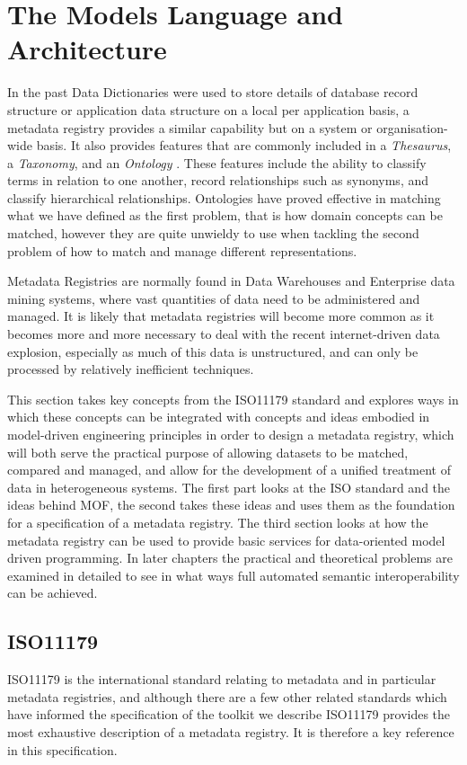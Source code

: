 \section{The Models Language and Architecture}

In the past Data Dictionaries were used to store details of database record structure or application data structure on a local per application basis, a metadata registry provides a similar capability but on a system or organisation-wide basis. It also provides features that are commonly included in a \emph{Thesaurus}, a \emph{Taxonomy}, and an \emph{Ontology} . These features include the ability to classify terms in relation to one another, record relationships such as synonyms, and classify hierarchical relationships. Ontologies have proved effective in matching what we have defined as the first problem, that is how domain concepts can be matched, however they are quite unwieldy to use when tackling the second problem of how to match and manage different representations.


Metadata Registries are normally found in Data Warehouses and Enterprise data mining systems, where vast quantities of data need to be administered and managed. It is likely that metadata registries will become more common as it becomes more and more necessary to deal with the recent internet-driven data explosion, especially as much of this data is unstructured, and can only be processed by relatively inefficient techniques.



This section takes key concepts from the ISO11179 standard and explores ways in which these concepts can be integrated with concepts and ideas embodied in model-driven engineering principles in order to design a metadata registry, which will both serve the practical purpose of allowing datasets to be matched, compared and managed, and allow for the development of a unified treatment of data in heterogeneous systems. The first part looks at the ISO standard and the ideas behind MOF, the second takes these ideas and uses them as the foundation for a specification of a metadata registry. The third section looks at how the metadata registry can be used to provide basic services for data-oriented model driven programming. In later chapters the practical and theoretical problems are examined in detailed to see in what ways full automated semantic interoperability can be achieved.


\subsection{ISO11179}
ISO11179 is the international standard relating to metadata and in particular metadata registries, and although there are a few other related standards which have informed the specification of the toolkit we describe ISO11179 provides the most exhaustive description of a metadata registry. It is therefore a key reference in this specification.




